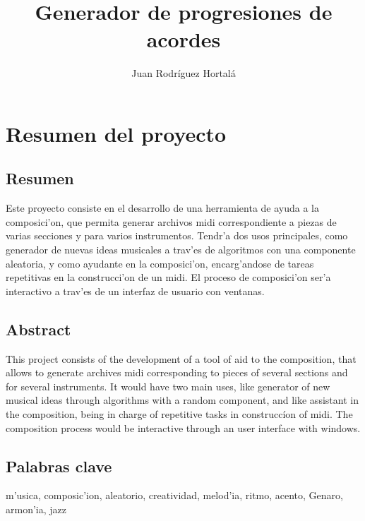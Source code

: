 \documentclass[a4paper,12pt]{article}
\author{Juan Rodr\'iguez Hortal\'a}
\title{Generador de progresiones de acordes}
\begin{document}
\maketitle
\tableofcontents
\section{Resumen del proyecto}

\subsection*{Resumen}
Este proyecto consiste en el desarrollo de una herramienta de ayuda a la composici'on, que permita generar archivos midi correspondiente a piezas de varias secciones y para varios instrumentos. Tendr'a dos usos principales, como generador de nuevas ideas musicales a trav'es de algoritmos con una componente aleatoria, y como ayudante en la composici'on, encarg'andose de tareas repetitivas en la construcci'on de un midi. El proceso de composici'on ser'a interactivo a trav'es de un interfaz de usuario con ventanas.

\subsection*{Abstract}
This project consists of the development of a tool of aid to the composition, that allows to generate archives midi corresponding to pieces of several sections and for several instruments. It would have two main uses, like generator of new musical ideas through algorithms with a random component, and like assistant in the composition, being in charge of repetitive tasks in construccíon of midi. The composition process would be interactive through an user interface with windows.

\subsection*{Palabras clave}
m'usica, composic'ion, aleatorio, creatividad, melod'ia, ritmo, acento, Genaro, armon'ia, jazz
\end{document}

